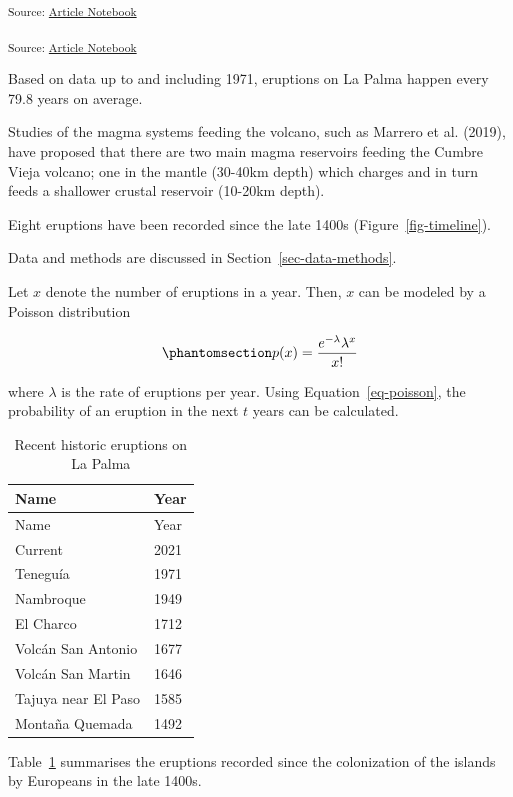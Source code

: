 \documentclass[
]{agujournal2019}
\begin{document}
\textsubscript{Source:
\href{https://EmouAcademy.github.io/my-awesome-manuscripts/index.qmd.html}{Article
Notebook}}

\textsubscript{Source:
\href{https://EmouAcademy.github.io/my-awesome-manuscripts/index.qmd.html}{Article
Notebook}}

Based on data up to and including 1971, eruptions on La Palma happen
every 79.8 years on average.

Studies of the magma systems feeding the volcano, such as Marrero et al.
(2019), have proposed that there are two main magma reservoirs feeding
the Cumbre Vieja volcano; one in the mantle (30-40km depth) which
charges and in turn feeds a shallower crustal reservoir (10-20km depth).

Eight eruptions have been recorded since the late 1400s
(Figure~\ref{fig-timeline}).

Data and methods are discussed in Section~\ref{sec-data-methods}.

Let \(x\) denote the number of eruptions in a year. Then, \(x\) can be
modeled by a Poisson distribution

\begin{equation}\phantomsection\label{eq-poisson}{
p(x) = \frac{e^{-\lambda} \lambda^{x}}{x !}
}\end{equation}

where \(\lambda\) is the rate of eruptions per year. Using
Equation~\ref{eq-poisson}, the probability of an eruption in the next
\(t\) years can be calculated.

\begin{longtable}[]{@{}ll@{}}
\caption{Recent historic eruptions on La
Palma}\label{tbl-history}\tabularnewline
\toprule\noalign{}
Name & Year \\
\midrule\noalign{}
\endfirsthead
\toprule\noalign{}
Name & Year \\
\midrule\noalign{}
\endhead
\bottomrule\noalign{}
\endlastfoot
Current & 2021 \\
Teneguía & 1971 \\
Nambroque & 1949 \\
El Charco & 1712 \\
Volcán San Antonio & 1677 \\
Volcán San Martin & 1646 \\
Tajuya near El Paso & 1585 \\
Montaña Quemada & 1492 \\
\end{longtable}

Table~\ref{tbl-history} summarises the eruptions recorded since the
colonization of the islands by Europeans in the late 1400s.
\end{document}
